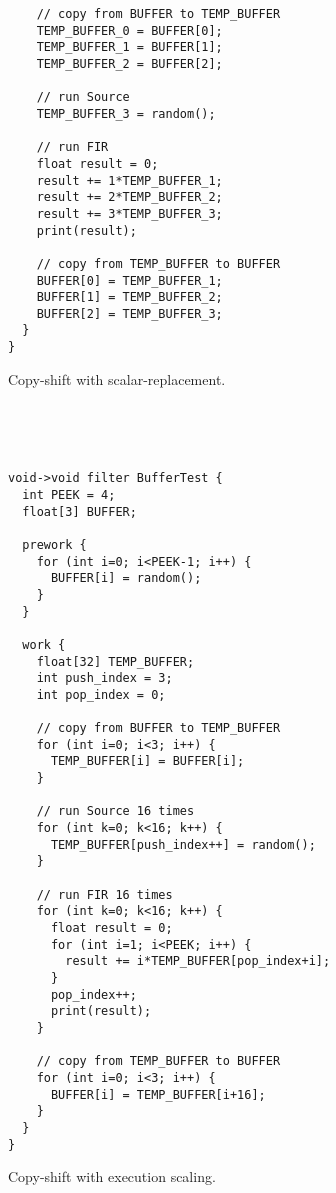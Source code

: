 \begin{figure*}
\begin{minipage}[t]{2in}
{\begin{verbatim}
    // copy from BUFFER to TEMP_BUFFER
    TEMP_BUFFER_0 = BUFFER[0];
    TEMP_BUFFER_1 = BUFFER[1];
    TEMP_BUFFER_2 = BUFFER[2];

    // run Source
    TEMP_BUFFER_3 = random();
    
    // run FIR
    float result = 0;
    result += 1*TEMP_BUFFER_1;
    result += 2*TEMP_BUFFER_2;
    result += 3*TEMP_BUFFER_3;
    print(result);

    // copy from TEMP_BUFFER to BUFFER
    BUFFER[0] = TEMP_BUFFER_1;
    BUFFER[1] = TEMP_BUFFER_2;
    BUFFER[2] = TEMP_BUFFER_3;
  }
}
\end{verbatim}}

\caption{Copy-shift with scalar-replacement.\protect\label{fig:code-scalar-replace}}
\end{minipage}
~~\vrule~~
\begin{minipage}[t]{2.1in}
{\scriptsize
\begin{verbatim}


void->void filter BufferTest {
  int PEEK = 4;
  float[3] BUFFER;

  prework {
    for (int i=0; i<PEEK-1; i++) {
      BUFFER[i] = random();
    }
  }

  work {
    float[32] TEMP_BUFFER;
    int push_index = 3;
    int pop_index = 0;

    // copy from BUFFER to TEMP_BUFFER
    for (int i=0; i<3; i++) {
      TEMP_BUFFER[i] = BUFFER[i];
    }

    // run Source 16 times
    for (int k=0; k<16; k++) {
      TEMP_BUFFER[push_index++] = random();
    }
    
    // run FIR 16 times
    for (int k=0; k<16; k++) {
      float result = 0;
      for (int i=1; i<PEEK; i++) {
        result += i*TEMP_BUFFER[pop_index+i];
      }
      pop_index++;
      print(result);
    }
      
    // copy from TEMP_BUFFER to BUFFER
    for (int i=0; i<3; i++) {
      BUFFER[i] = TEMP_BUFFER[i+16];
    }
  }
}
\end{verbatim}}

\caption{Copy-shift with execution scaling.\protect\label{fig:code-scaling}}
\end{minipage}
\end{figure*}
\clearpage
